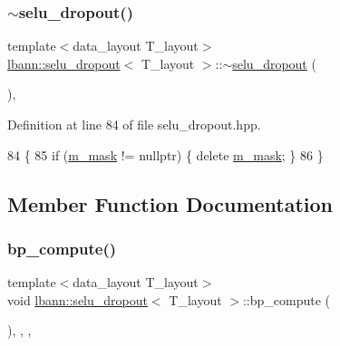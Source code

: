 \subsubsection{\texorpdfstring{$\sim$selu\+\_\+dropout()}{~selu\_dropout()}}
{\footnotesize\ttfamily template$<$data\+\_\+layout T\+\_\+layout$>$ \\
\hyperlink{classlbann_1_1selu__dropout}{lbann\+::selu\+\_\+dropout}$<$ T\+\_\+layout $>$\+::$\sim$\hyperlink{classlbann_1_1selu__dropout}{selu\+\_\+dropout} (\begin{DoxyParamCaption}{ }\end{DoxyParamCaption})\hspace{0.3cm}{\ttfamily [inline]}, {\ttfamily [override]}}



Definition at line 84 of file selu\+\_\+dropout.\+hpp.


\begin{DoxyCode}
84                            \{
85     \textcolor{keywordflow}{if} (\hyperlink{classlbann_1_1selu__dropout_a31aaadbc51d78673a84390b48d4e5950}{m\_mask} != \textcolor{keyword}{nullptr}) \{ \textcolor{keyword}{delete} \hyperlink{classlbann_1_1selu__dropout_a31aaadbc51d78673a84390b48d4e5950}{m\_mask}; \}
86   \}
\end{DoxyCode}


\subsection{Member Function Documentation}
\mbox{\label{classlbann_1_1selu__dropout_afc80277386fef53296368579876bdb55}} 
\subsubsection{\texorpdfstring{bp\+\_\+compute()}{bp\_compute()}}
{\footnotesize\ttfamily template$<$data\+\_\+layout T\+\_\+layout$>$ \\
void \hyperlink{classlbann_1_1selu__dropout}{lbann\+::selu\+\_\+dropout}$<$ T\+\_\+layout $>$\+::bp\+\_\+compute (\begin{DoxyParamCaption}{ }\end{DoxyParamCaption})\hspace{0.3cm}{\ttfamily [inline]}, {\ttfamily [override]}, {\ttfamily [protected]}, {\ttfamily [virtual]}}

